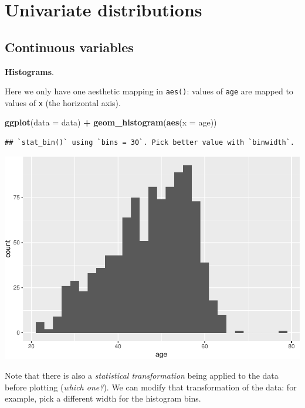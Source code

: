 \documentclass[
]{book}
\newenvironment{Shaded}{\begin{snugshade}}{\end{snugshade}}
\newcommand{\AttributeTok}[1]{\textcolor[rgb]{0.13,0.29,0.53}{#1}}
\newcommand{\FunctionTok}[1]{\textcolor[rgb]{0.13,0.29,0.53}{\textbf{#1}}}
\newcommand{\NormalTok}[1]{#1}
\newcommand{\SpecialCharTok}[1]{\textcolor[rgb]{0.81,0.36,0.00}{\textbf{#1}}}
\begin{document}
\hypertarget{univariate-distributions}{%
\section{Univariate distributions}\label{univariate-distributions}}

\hypertarget{continuous-variables}{%
\subsection{Continuous variables}\label{continuous-variables}}

\textbf{Histograms}.

Here we only have one aesthetic mapping in \texttt{aes()}: values of \texttt{age} are mapped to values of \texttt{x} (the horizontal axis).

\begin{Shaded}
\begin{Highlighting}[]
\FunctionTok{ggplot}\NormalTok{(}\AttributeTok{data =}\NormalTok{ data) }\SpecialCharTok{+}
  \FunctionTok{geom\_histogram}\NormalTok{(}\FunctionTok{aes}\NormalTok{(}\AttributeTok{x =}\NormalTok{ age))}
\end{Highlighting}
\end{Shaded}

\begin{verbatim}
## `stat_bin()` using `bins = 30`. Pick better value with `binwidth`.
\end{verbatim}

\includegraphics{R-for-social-research-and-business-analytics_files/figure-latex/unnamed-chunk-17-1.pdf}

Note that there is also a \emph{statistical transformation} being applied to the data before plotting (\emph{which one?}). We can modify that transformation of the data: for example, pick a different width for the histogram bins.
\end{document}
